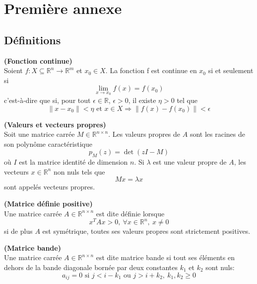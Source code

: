 \chapter{Premi\`ere annexe}
\label{annexe:A}


\section{D\'efinitions}
\label{annexe:A:def}

\begin{frdefinition}\textbf {(Fonction continue)} \\
Soient $f:X\subseteq\mathbb{R}^n\rightarrow\mathbb{R}^m$ et $x_0\in X$. La fonction f est continue en $x_0$ 
si et seulement si
 $$\lim_{x\rightarrow x_0} f(x)=f(x_0)$$
c'est-\`a-dire que si, pour tout $\epsilon \in \mathbb{R}$, $\epsilon>0$, il existe $\eta>0$ tel que 
$$\lVert x-x_0\rVert < \eta \text{ et } x \in X \Rightarrow \lVert f(x)-f(x_0)\rVert < \epsilon$$
\end{frdefinition}


\begin{frdefinition}\textbf {(Valeurs et vecteurs propres)} \\
Soit une matrice carr\'ee $M\in \mathbb{R}^{n\times n}$. Les valeurs propres de $A$ sont les racines 
de son polyn\^ome caract\'eristique
$$p_M(z)=\det(zI-M)$$
o\`u $I$ est la matrice identit\'e de dimension $n$. Si $\lambda$ est une valeur propre de $A$, les vecteurs
$x\in \mathbb{R}^n$ non nuls tels que $$ Mx=\lambda x$$
sont appel\'es vecteurs propres.
\end{frdefinition}


\begin{frdefinition}\textbf {(Matrice d\'efinie positive)} \\
Une matrice carr\'ee $A \in \mathbb{R}^{n\times n}$ est dite d\'efinie lorsque \\
$$x^TAx>0, \ \forall x\in \mathbb{R}^n, \ x\neq 0$$
si de plus $A$ est sym\'etrique, toutes ses valeurs propres sont strictement positives. 
\end{frdefinition}



\begin{frdefinition}\textbf {(Matrice bande)} \\
Une matrice carr\'ee $A \in \mathbb{R}^{n\times n}$ est dite matrice bande si tout ses \'el\'ements 
en dehors de la bande diagonale born\'ee par deux constantes $k_1$ et $k_2$ sont nuls:
\begin{equation*}
 a_{ij}=0 \text{  si  }  j < i-k_1 \text{  ou  } j >i+k_2, \ k_1,k_2 \geq 0 
\end{equation*}



\end{frdefinition}






